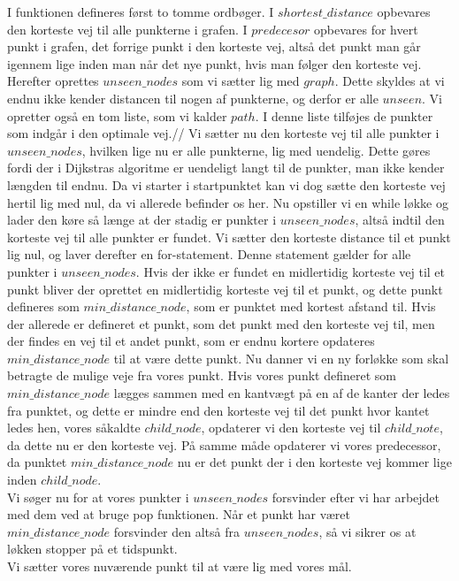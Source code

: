 I funktionen defineres først to tomme ordbøger. I $shortest\_distance$ opbevares den korteste vej til alle punkterne i grafen. I $predecesor$ opbevares for hvert punkt i grafen, det forrige punkt i den korteste vej, altså det punkt man går igennem lige inden man når det nye punkt, hvis man følger den korteste vej. Herefter oprettes $unseen\_nodes$ som vi sætter lig med $graph$. Dette skyldes at vi endnu ikke kender distancen til nogen af punkterne, og derfor er alle $unseen$. Vi opretter også en tom liste, som vi kalder $path$. I denne liste tilføjes de punkter som indgår i den optimale vej.//
Vi sætter nu den korteste vej til alle punkter i $unseen\_nodes$, hvilken lige nu er alle punkterne, lig med uendelig. Dette gøres fordi der i Dijkstras algoritme er uendeligt langt til de punkter, man ikke kender længden til endnu. Da vi starter i startpunktet kan vi dog sætte den korteste vej hertil lig med nul, da vi allerede befinder os her.
Nu opstiller vi en while løkke og lader den køre så længe at der stadig er punkter i $unseen\_nodes$, altså indtil den korteste vej til alle punkter er fundet.
Vi sætter den korteste distance til et punkt lig nul, og laver derefter en for-statement. Denne statement gælder for alle punkter i $unseen\_nodes$. Hvis der ikke er fundet en midlertidig korteste vej til et punkt bliver der oprettet en midlertidig korteste vej til et punkt, og dette punkt defineres som $min\_distance\_node$, som er punktet med kortest afstand til. Hvis der allerede er defineret et punkt, som det punkt med den korteste vej til, men der findes en vej til et andet punkt, som er endnu kortere opdateres $min\_distance\_node$ til at være dette punkt.
Nu danner vi en ny forløkke som skal betragte de mulige veje fra vores punkt.
Hvis vores punkt defineret som $min\_distance\_node$ lægges sammen med en kantvægt på en af de kanter der ledes fra punktet, og dette er mindre end den korteste vej til det punkt hvor kantet ledes hen, vores såkaldte $child\_node$, opdaterer vi den korteste vej til $child\_note$, da dette nu er den korteste vej. På samme måde opdaterer vi vores predecessor, da punktet $min\_distance\_node$ nu er det punkt der i den korteste vej kommer lige inden $child\_node$.\\
Vi søger nu for at vores punkter i $unseen\_nodes$ forsvinder efter vi har arbejdet med dem ved at bruge pop funktionen. Når et punkt har været $min\_distance\_node$ forsvinder den altså fra $unseen\_nodes$, så vi sikrer os at løkken stopper på et tidspunkt. \\
Vi sætter vores nuværende punkt til at være lig med vores mål.
